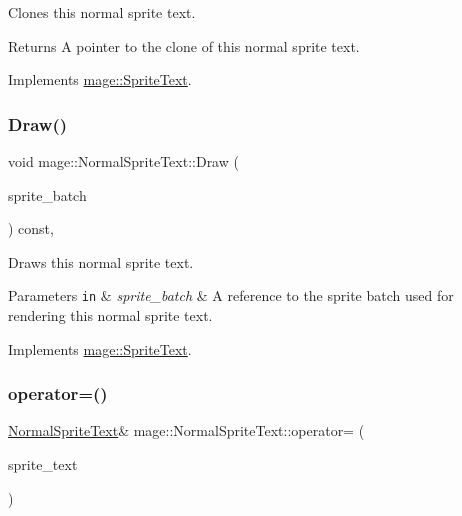 Clones this normal sprite text.

\begin{DoxyReturn}{Returns}
A pointer to the clone of this normal sprite text. 
\end{DoxyReturn}


Implements \hyperlink{classmage_1_1_sprite_text_aa2c63346f5ad7f63f7a6d474df3556ef}{mage\+::\+Sprite\+Text}.

\hypertarget{classmage_1_1_normal_sprite_text_ad2a1b02bea18afd6bf61b106a727a355}{}\label{classmage_1_1_normal_sprite_text_ad2a1b02bea18afd6bf61b106a727a355} 
\subsubsection{\texorpdfstring{Draw()}{Draw()}}
{\footnotesize\ttfamily void mage\+::\+Normal\+Sprite\+Text\+::\+Draw (\begin{DoxyParamCaption}\item[{\hyperlink{classmage_1_1_sprite_batch}{Sprite\+Batch} \&}]{sprite\+\_\+batch }\end{DoxyParamCaption}) const\hspace{0.3cm}{\ttfamily [override]}, {\ttfamily [virtual]}}

Draws this normal sprite text.


\begin{DoxyParams}[1]{Parameters}
\mbox{\tt in}  & {\em sprite\+\_\+batch} & A reference to the sprite batch used for rendering this normal sprite text. \\
\hline
\end{DoxyParams}


Implements \hyperlink{classmage_1_1_sprite_text_a45d5ac8410d5a46b26e8491946a2ad9e}{mage\+::\+Sprite\+Text}.

\hypertarget{classmage_1_1_normal_sprite_text_ab7dbd2e71dcaef5d6b7b767afa8d7094}{}\label{classmage_1_1_normal_sprite_text_ab7dbd2e71dcaef5d6b7b767afa8d7094} 
\subsubsection{\texorpdfstring{operator=()}{operator=()}\hspace{0.1cm}{\footnotesize\ttfamily [1/2]}}
{\footnotesize\ttfamily \hyperlink{classmage_1_1_normal_sprite_text}{Normal\+Sprite\+Text}\& mage\+::\+Normal\+Sprite\+Text\+::operator= (\begin{DoxyParamCaption}\item[{const \hyperlink{classmage_1_1_normal_sprite_text}{Normal\+Sprite\+Text} \&}]{sprite\+\_\+text }\end{DoxyParamCaption})\hspace{0.3cm}{\ttfamily [delete]}}

